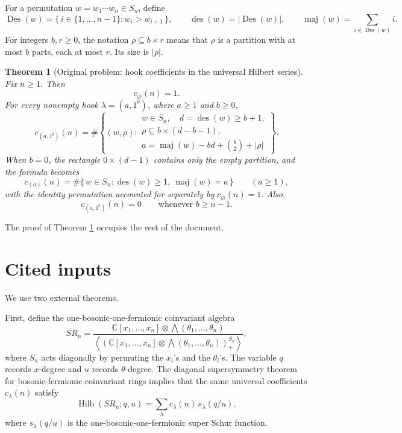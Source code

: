 \documentclass[12pt]{article}
\newtheorem{theorem}{Theorem}
\DeclareMathOperator{\Hilb}{Hilb}
\DeclareMathOperator{\Des}{Des}
\DeclareMathOperator{\des}{des}
\DeclareMathOperator{\maj}{maj}
\begin{document}
For a permutation \(w=w_1\cdots w_n\in S_n\), define
\[
\Des(w)=\{\,i\in\{1,\ldots,n-1\}:w_i>w_{i+1}\,\},
\qquad
\des(w)=|\Des(w)|,
\qquad
\maj(w)=\sum_{i\in\Des(w)}i.
\]
For integers \(b,r\ge 0\), the notation \(\rho\subseteq b\times r\) means that \(\rho\) is a partition with at most \(b\) parts, each at most \(r\).  Its size is \(|\rho|\).

\begin{theorem}[Original problem: hook coefficients in the universal Hilbert series]\label{thm:main}
Fix \(n\ge 1\).  Then
\[
c_{\varnothing}(n)=1.
\]
For every nonempty hook \(\lambda=(a,1^b)\), where \(a\ge 1\) and \(b\ge 0\),
\[
\boxed{
c_{(a,1^b)}(n)
=
\#\left\{
(w,\rho):
\begin{array}{l}
w\in S_n,\quad d=\des(w)\ge b+1,\\[2pt]
\rho\subseteq b\times(d-b-1),\\[2pt]
a=\maj(w)-bd+\binom{b}{2}+|\rho|
\end{array}
\right\}.
}
\]
When \(b=0\), the rectangle \(0\times(d-1)\) contains only the empty partition, and the formula becomes
\[
c_{(a)}(n)
=
\#\{\,w\in S_n:\des(w)\ge 1,\ \maj(w)=a\,\}
\qquad (a\ge 1),
\]
with the identity permutation accounted for separately by \(c_{\varnothing}(n)=1\).  Also,
\[
c_{(a,1^b)}(n)=0
\qquad\text{whenever } b\ge n-1.
\]
\end{theorem}

The proof of Theorem \ref{thm:main} occupies the rest of the document.

\section{Cited inputs}

We use two external theorems.

First, define the one-bosonic-one-fermionic coinvariant algebra
\[
SR_n
=
\frac{\mathbb C[x_1,\ldots,x_n]\otimes \bigwedge(\theta_1,\ldots,\theta_n)}
{\left\langle
\left(\mathbb C[x_1,\ldots,x_n]\otimes \bigwedge(\theta_1,\ldots,\theta_n)\right)^{S_n}_{+}
\right\rangle},
\]
where \(S_n\) acts diagonally by permuting the \(x_i\)'s and the \(\theta_i\)'s.  The variable \(q\) records \(x\)-degree and \(u\) records \(\theta\)-degree.  The diagonal supersymmetry theorem for bosonic-fermionic coinvariant rings \cite{Lentfer2025} implies that the same universal coefficients \(c_\lambda(n)\) satisfy
\begin{equation}\label{eq:diagonal-supersymmetry}
\Hilb(SR_n;q,u)
=
\sum_\lambda c_\lambda(n)\,s_\lambda(q/u),
\end{equation}
where \(s_\lambda(q/u)\) is the one-bosonic-one-fermionic super Schur function.
\end{document}
